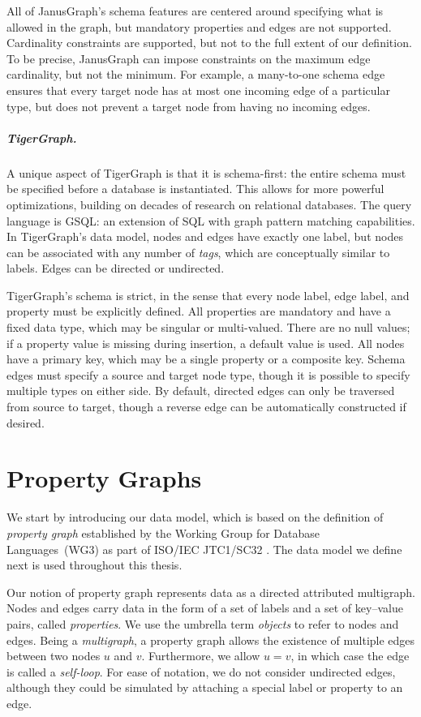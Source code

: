 \documentclass{report}
\theoremstyle{definition}
\begin{document}
All of JanusGraph's schema features are centered around specifying what is allowed in the graph, but mandatory properties and edges are not supported. Cardinality constraints are supported, but not to the full extent of our definition. To be precise, JanusGraph can impose constraints on the maximum edge cardinality, but not the minimum. For example, a many-to-one schema edge ensures that every target node has at most one incoming edge of a particular type, but does not prevent a target node from having no incoming edges.

\paragraph{TigerGraph.} A unique aspect of TigerGraph \citep{deutsch2019tigergraph} is that it is schema-first: the entire schema must be specified before a database is instantiated. This allows for more powerful optimizations, building on decades of research on relational databases. The query language is GSQL: an extension of SQL with graph pattern matching capabilities. In TigerGraph's data model, nodes and edges have exactly one label, but nodes can be associated with any number of \emph{tags}, which are conceptually similar to labels. Edges can be directed or undirected.

TigerGraph's schema is strict, in the sense that every node label, edge label, and property must be explicitly defined. All properties are mandatory and have a fixed data type, which may be singular or multi-valued. There are no null values; if a property value is missing during insertion, a default value is used. All nodes have a primary key, which may be a single property or a composite key. Schema edges must specify a source and target node type, though it is possible to specify multiple types on either side. By default, directed edges can only be traversed from source to target, though a reverse edge can be automatically constructed if desired.

\chapter{Property Graphs}

We start by introducing our data model, which is based on the definition of \emph{property graph} established by the Working Group for Database Languages~(WG3) as part of ISO/IEC JTC1/SC32 \citep{deutsch2021gpml}. The data model we define next is used throughout this thesis.

Our notion of property graph represents data as a directed attributed multigraph. Nodes and edges carry data in the form of a set of labels and a set of key--value pairs, called \emph{properties}. We use the umbrella term \emph{objects} to refer to nodes and edges. Being a \emph{multigraph}, a property graph allows the existence of multiple edges between two nodes $u$ and $v$. Furthermore, we allow $u = v$, in which case the edge is called a \emph{self-loop}. For ease of notation, we do not consider undirected edges, although they could be simulated by attaching a special label or property to an edge.
\end{document}
